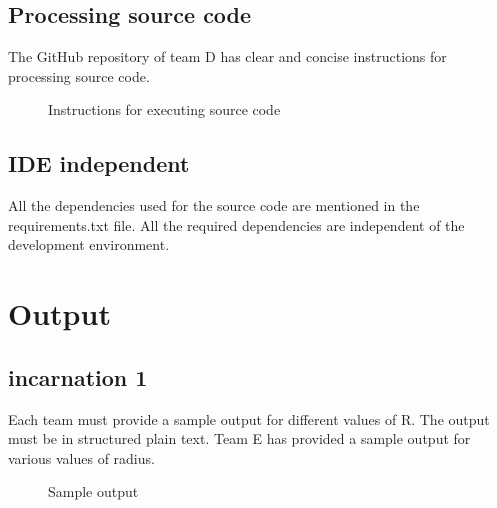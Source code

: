 \subsection{Processing source code}
\begin{flushleft}
    The GitHub repository of team D has clear and concise instructions for processing source code.
    \begin{figure}[h!]
        \centering
        \vspace{.5cm}
        \caption{Instructions for executing source code}
        \label{fig:run instructions }
    \end{figure}
\end{flushleft}
\subsection{IDE independent}
\begin{flushleft}
    All the dependencies used for the source code are mentioned in the requirements.txt file. All the required dependencies are independent of the development environment.
\end{flushleft}
  \section{Output}
  \subsection{incarnation 1}
  \begin{flushleft}
    Each team must provide a sample output for different values of R. The output must be in structured plain text. Team E has provided a sample output for various values of radius.
  \end{flushleft}
  \begin{figure}[h!]
    \centering
    \vspace{.5cm}
    \caption{Sample output}
    \label{fig:cos }
  \end{figure}
